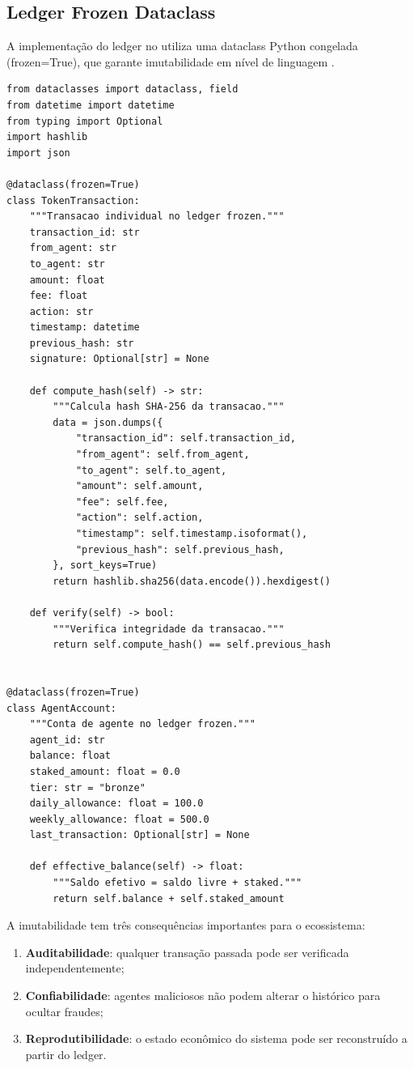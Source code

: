 \subsection{Ledger Frozen Dataclass}

A implementação do ledger no \opencodeeco{} utiliza uma dataclass
Python congelada (frozen=True), que garante imutabilidade em nível
de linguagem \cite{opencode2026token}.

\begin{lstlisting}[caption={Ledger frozen dataclass (SPEC-022)},label={lst:ledger-dataclass}]
from dataclasses import dataclass, field
from datetime import datetime
from typing import Optional
import hashlib
import json

@dataclass(frozen=True)
class TokenTransaction:
    """Transacao individual no ledger frozen."""
    transaction_id: str
    from_agent: str
    to_agent: str
    amount: float
    fee: float
    action: str
    timestamp: datetime
    previous_hash: str
    signature: Optional[str] = None

    def compute_hash(self) -> str:
        """Calcula hash SHA-256 da transacao."""
        data = json.dumps({
            "transaction_id": self.transaction_id,
            "from_agent": self.from_agent,
            "to_agent": self.to_agent,
            "amount": self.amount,
            "fee": self.fee,
            "action": self.action,
            "timestamp": self.timestamp.isoformat(),
            "previous_hash": self.previous_hash,
        }, sort_keys=True)
        return hashlib.sha256(data.encode()).hexdigest()

    def verify(self) -> bool:
        """Verifica integridade da transacao."""
        return self.compute_hash() == self.previous_hash


@dataclass(frozen=True)
class AgentAccount:
    """Conta de agente no ledger frozen."""
    agent_id: str
    balance: float
    staked_amount: float = 0.0
    tier: str = "bronze"
    daily_allowance: float = 100.0
    weekly_allowance: float = 500.0
    last_transaction: Optional[str] = None

    def effective_balance(self) -> float:
        """Saldo efetivo = saldo livre + staked."""
        return self.balance + self.staked_amount
\end{lstlisting}

A imutabilidade tem três consequências importantes para o
ecossistema:

\begin{enumerate}
\item \textbf{Auditabilidade}: qualquer transação passada pode
ser verificada independentemente;
\item \textbf{Confiabilidade}: agentes maliciosos não podem
alterar o histórico para ocultar fraudes;
\item \textbf{Reprodutibilidade}: o estado econômico do sistema
pode ser reconstruído a partir do ledger.
\end{enumerate}

